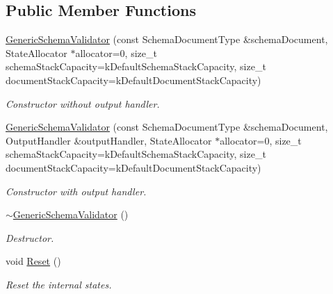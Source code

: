 \subsection*{Public Member Functions}
\begin{DoxyCompactItemize}
\item 
\hyperlink{class_generic_schema_validator_a202ee6fdbe5ae9eab3e77a81ecdfeb6d}{Generic\+Schema\+Validator} (const Schema\+Document\+Type \&schema\+Document, State\+Allocator $\ast$allocator=0, size\+\_\+t schema\+Stack\+Capacity=k\+Default\+Schema\+Stack\+Capacity, size\+\_\+t document\+Stack\+Capacity=k\+Default\+Document\+Stack\+Capacity)
\begin{DoxyCompactList}\small\item\em Constructor without output handler. \end{DoxyCompactList}\item 
\hyperlink{class_generic_schema_validator_ac2027be8ca55b01cd6f38b45f4e233b4}{Generic\+Schema\+Validator} (const Schema\+Document\+Type \&schema\+Document, Output\+Handler \&output\+Handler, State\+Allocator $\ast$allocator=0, size\+\_\+t schema\+Stack\+Capacity=k\+Default\+Schema\+Stack\+Capacity, size\+\_\+t document\+Stack\+Capacity=k\+Default\+Document\+Stack\+Capacity)
\begin{DoxyCompactList}\small\item\em Constructor with output handler. \end{DoxyCompactList}\item 
\mbox{\label{class_generic_schema_validator_a3eab83d483a50efb0c0390adf3291963}} 
\hyperlink{class_generic_schema_validator_a3eab83d483a50efb0c0390adf3291963}{$\sim$\+Generic\+Schema\+Validator} ()
\begin{DoxyCompactList}\small\item\em Destructor. \end{DoxyCompactList}\item 
\mbox{\label{class_generic_schema_validator_a49efbbe098cb77728be3d48cafed17e4}} 
void \hyperlink{class_generic_schema_validator_a49efbbe098cb77728be3d48cafed17e4}{Reset} ()
\begin{DoxyCompactList}\small\item\em Reset the internal states. \end{DoxyCompactList}\item 
\mbox{\label{class_generic_schema_validator_a8ebda4da3d8b1fc41e57f15dd62e8f19}} 

\end{DoxyCompactItemize}

